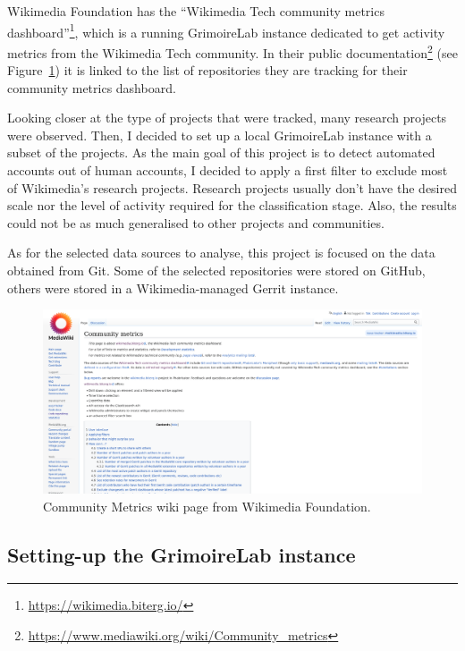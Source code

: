 \documentclass[a4paper, 12pt]{book}
\begin{document}
Wikimedia Foundation has the ``Wikimedia Tech community metrics dashboard''\footnote{\url{https://wikimedia.biterg.io/}}, which is a running GrimoireLab instance dedicated to get activity metrics from the Wikimedia Tech community. In their public documentation\footnote{\url{https://www.mediawiki.org/wiki/Community_metrics}} (see Figure~\ref{fig:wikimedia-wiki}) it is linked to the list of repositories they are tracking for their community metrics dashboard.

Looking closer at the type of projects that were tracked, many research projects were observed. Then, I decided to set up a local GrimoireLab instance with a subset of the projects. As the main goal of this project is to detect automated accounts out of human accounts, I decided to apply a first filter to exclude most of Wikimedia's research projects. Research projects usually don't have the desired scale nor the level of activity required for the classification stage. Also, the results could not be as much generalised to other projects and communities.

As for the selected data sources to analyse, this project is focused on the data obtained from Git. Some of the selected repositories were stored on GitHub, others were stored in a Wikimedia-managed Gerrit instance.

\begin{figure}
 \centering
  \includegraphics[width=15cm, keepaspectratio]{img/community-metrics-wiki.png}
  \caption{Community Metrics wiki page from Wikimedia Foundation.}
  \label{fig:wikimedia-wiki}
\end{figure}

\subsection{Setting-up the GrimoireLab instance}
\label{ssec:setting-grimoirelab}
\end{document}
